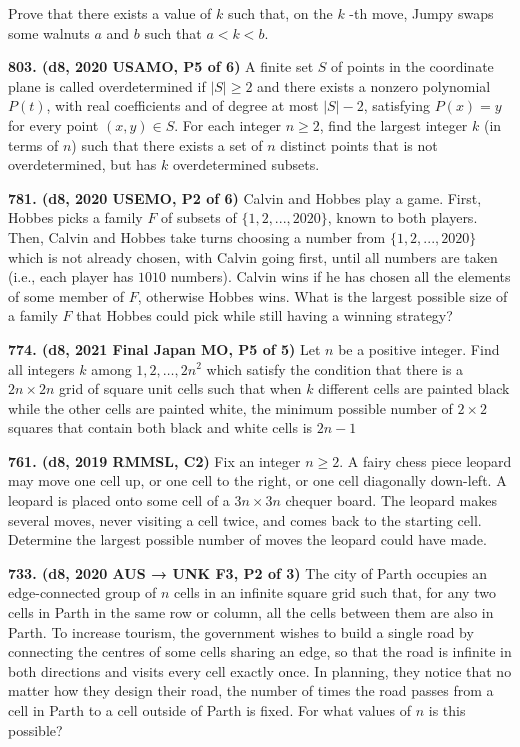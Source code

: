 \documentclass{article}
\begin{document}
Prove that there exists a value of $k$ such that, on the $k$ -th move, Jumpy swaps some walnuts $a$ and $b$ such that $a<k<b$.

\textbf{803. (\color{red}d8\color{black}, 2020 USAMO, P5 of 6)} A finite set $S$ of points in the coordinate plane is called overdetermined if $|S|\ge 2$ and there exists a nonzero polynomial $P(t)$, with real coefficients and of degree at most $|S|-2$, satisfying $P(x)=y$ for every point $(x,y)\in S$.
\smallbreak
For each integer $n\ge 2$, find the largest integer $k$ (in terms of $n$) such that there exists a set of $n$ distinct points that is not overdetermined, but has $k$ overdetermined subsets.

\textbf{781. (\color{red}d8\color{black}, 2020 USEMO, P2 of 6)} Calvin and Hobbes play a game. First, Hobbes picks a family $F$ of subsets of $\{1, 2, . . . , 2020\}$, known to both players. Then, Calvin and Hobbes take turns choosing a number from $\{1, 2, . . . , 2020\}$ which is not already chosen, with Calvin going first, until all numbers are taken (i.e., each player has $1010$ numbers). Calvin wins if he has chosen all the elements of some member of $F$, otherwise Hobbes wins. What is the largest possible size of a family $F$ that Hobbes could pick while still having a winning strategy?

\textbf{774. (\color{red}d8\color{black}, 2021 Final Japan MO, P5 of 5)} Let $n$ be a positive integer. Find all integers $k$ among $1,2,\dots,2n^2$ which satisfy the condition that there is a $2n\times 2n$ grid of square unit cells such that when $k$ different cells are painted black while the other cells are painted white, the minimum possible number of $2\times 2$ squares that contain both black and white cells is $2n-1$

\textbf{761. (\color{red}d8\color{black}, 2019 RMMSL, C2)} Fix an integer $n \ge 2$. A fairy chess piece leopard may move one cell up, or one cell to the right, or one cell diagonally down-left. A leopard is placed onto some cell of a $3n \times 3n$ chequer board. The leopard makes several moves, never visiting a cell twice, and comes back to the starting cell. Determine the largest possible number of moves the leopard could have made.

\textbf{733. (\color{red}d8\color{black}, 2020 AUS → UNK F3, P2 of 3)} The city of Parth occupies an edge-connected group of $n$ cells in an infinite square
grid such that, for any two cells in Parth in the same row or column, all the cells between
them are also in Parth. To increase tourism, the government wishes to build a single road
by connecting the centres of some cells sharing an edge, so that the road is infinite in both
directions and visits every cell exactly once. In planning, they notice that no matter how they
design their road, the number of times the road passes from a cell in Parth to a cell outside of
Parth is fixed. For what values of $n$ is this possible?
\end{document}
